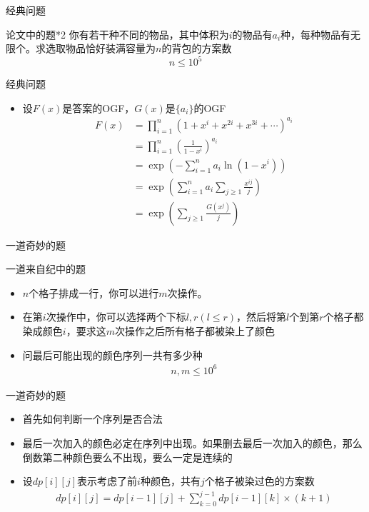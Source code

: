 \documentclass{beamer}
\begin{document}
\begin{frame}{经典问题}
    \begin{block}{论文中的题*2}
        你有若干种不同的物品，其中体积为$i$的物品有$a_i$种，每种物品有无限个。求选取物品恰好装满容量为$n$的背包的方案数
        $$n\leq 10^5$$
    \end{block}
\end{frame}

\begin{frame}{经典问题}
    \begin{itemize}
        \item 设$F(x)$是答案的OGF，$G(x)$是$\{a_i\}$的OGF \pause
        $$\begin{aligned}
            F(x)&=\prod_{i=1}^n(1+x^i+x^{2i}+x^{3i}+\cdots)^{a_i}\\
            &=\prod_{i=1}^n(\frac{1}{1-x^i})^{a_i}\\
            &=\exp\left(-\sum_{i=1}^na_i\ln(1-x^i)\right)\\
            &=\exp\left(\sum_{i=1}^na_i\sum_{j\geq 1}\frac{x^{ij}}{j}\right)\\
            &=\exp\left(\sum_{j\geq 1}\frac{G(x^j)}{j}\right)
        \end{aligned}$$
    \end{itemize}
\end{frame}

\begin{frame}{一道奇妙的题}
    \begin{block}{一道来自纪中的题}
        \begin{itemize}
            \item $n$个格子排成一行，你可以进行$m$次操作。\par
            \item 在第$i$次操作中，你可以选择两个下标$l,r(l\leq r)$，然后将第$l$个到第$r$个格子都染成颜色$i$，要求这$m$次操作之后所有格子都被染上了颜色\par
            \item 问最后可能出现的颜色序列一共有多少种
            $$\begin{aligned}
                n,m\leq 10^6
            \end{aligned}$$
        \end{itemize}
    \end{block}
\end{frame}

\begin{frame}{一道奇妙的题}
    \begin{itemize}
        \item 首先如何判断一个序列是否合法 \pause
        \item 最后一次加入的颜色必定在序列中出现。如果删去最后一次加入的颜色，那么倒数第二种颜色要么不出现，要么一定是连续的 \pause
        \item 设$dp[i][j]$表示考虑了前$i$种颜色，共有$j$个格子被染过色的方案数 \pause
        $$\begin{aligned}
            dp[i][j] = dp[i - 1][j] + \sum_{k = 0}^{j - 1}dp[i - 1][k]\times (k + 1)
        \end{aligned}$$
    \end{itemize}
\end{frame}
\end{document}

